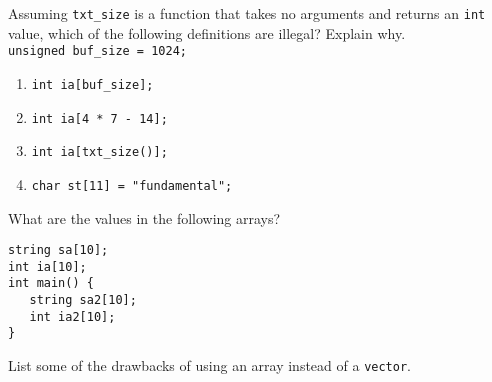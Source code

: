 %
%
\begin{question}
Assuming \verb|txt_size| is a function that takes no arguments
and returns an \verb|int| value, which of the following definitions are illegal? Explain why.\\
\verb|unsigned buf_size = 1024;|
\begin{enumerate}[label={(\alph*)}]
^^I\item \verb|int ia[buf_size];|
^^I\item \verb|int ia[4 * 7 - 14];|
^^I\item \verb|int ia[txt_size()];|
^^I\item \verb|char st[11] = "fundamental";|
\end{enumerate}
\end{question}

\begin{question}
What are the values in the following arrays?
\begin{lstlisting}
string sa[10];
int ia[10];
int main() {
   string sa2[10];
   int ia2[10];
}
\end{lstlisting}
\end{question}

\begin{question}
List some of the drawbacks of using an array instead of a \verb|vector|.
\end{question}
